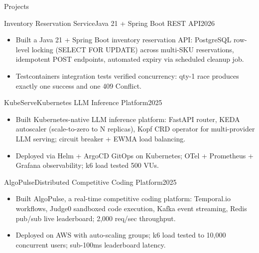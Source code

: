 \documentclass[]{mcdowellcv}
\begin{document}
\begin{cvsection}{Projects}
  \begin{cvsubsection}{Inventory Reservation Service}{Java 21 + Spring Boot REST API}{2026}
    \begin{itemize}
      \item Built a Java 21 + Spring Boot inventory reservation API: PostgreSQL row-level locking (SELECT FOR UPDATE) across multi-SKU reservations, idempotent POST endpoints, automated expiry via scheduled cleanup job.
      \item Testcontainers integration tests verified concurrency: qty-1 race produces exactly one success and one 409 Conflict.
    \end{itemize}
    \vspace{-1.5pt}
  \end{cvsubsection}

  \begin{cvsubsection}{KubeServe}{Kubernetes LLM Inference Platform}{2025}
    \begin{itemize}
      \item Built Kubernetes-native LLM inference platform: FastAPI router, KEDA autoscaler (scale-to-zero to N replicas), Kopf CRD operator for multi-provider LLM serving; circuit breaker + EWMA load balancing.
      \item Deployed via Helm + ArgoCD GitOps on Kubernetes; OTel + Prometheus + Grafana observability; k6 load tested 500 VUs.
    \end{itemize}
    \vspace{-1.5pt}
  \end{cvsubsection}

  \begin{cvsubsection}{AlgoPulse}{Distributed Competitive Coding Platform}{2025}
    \begin{itemize}
      \item Built AlgoPulse, a real-time competitive coding platform: Temporal.io workflows, Judge0 sandboxed code execution, Kafka event streaming, Redis pub/sub live leaderboard; 2,000 req/sec throughput.
      \item Deployed on AWS with auto-scaling groups; k6 load tested to 10,000 concurrent users; sub-100ms leaderboard latency.
    \end{itemize}
    \vspace{-1.5pt}
  \end{cvsubsection}
\end{cvsection}
\end{document}
